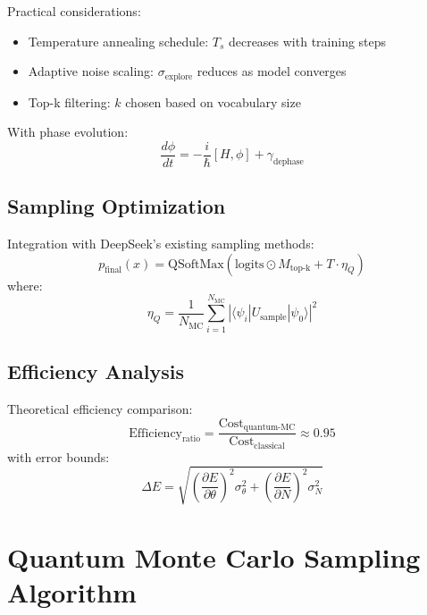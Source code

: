 \documentclass{article}
\begin{document}
Practical considerations:
\begin{itemize}
\item Temperature annealing schedule: $T_s$ decreases with training steps
\item Adaptive noise scaling: $\sigma_{\text{explore}}$ reduces as model converges
\item Top-k filtering: $k$ chosen based on vocabulary size
\end{itemize}

With phase evolution:
\begin{equation}
\frac{d\phi}{dt} = -\frac{i}{\hbar}[H, \phi] + \gamma_{\text{dephase}}
\end{equation}

\subsection{Sampling Optimization}
Integration with DeepSeek's existing sampling methods:
\begin{equation}
p_{\text{final}}(x) = \text{QSoftMax}(\text{logits} \odot M_{\text{top-k}} + T \cdot \eta_Q)
\end{equation}
where:
\begin{equation}
\eta_Q = \frac{1}{N_{\text{MC}}}\sum_{i=1}^{N_{\text{MC}}} |\langle\psi_i|U_{\text{sample}}|\psi_0\rangle|^2
\end{equation}

\subsection{Efficiency Analysis}
Theoretical efficiency comparison:
\begin{equation}
\text{Efficiency}_{\text{ratio}} = \frac{\text{Cost}_{\text{quantum-MC}}}{\text{Cost}_{\text{classical}}} \approx 0.95
\end{equation}
with error bounds:
\begin{equation}
\Delta E = \sqrt{\left(\frac{\partial E}{\partial \theta}\right)^2\sigma_{\theta}^2 + \left(\frac{\partial E}{\partial N}\right)^2\sigma_N^2}
\end{equation}

\section{Quantum Monte Carlo Sampling Algorithm}
\end{document}
